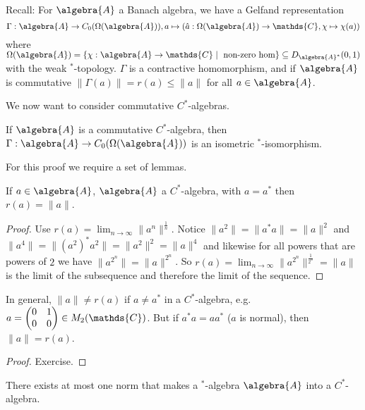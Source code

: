 \documentclass[a4paper]{article}
\begin{document}
Recall: For $\algebra{A}$ a Banach algebra, we have a Gelfand representation
\begin{equation*}
	\Gamma: \algebra{A} \to C_0(\Omega(\algebra{A})), a \mapsto (\hat{a}: \Omega(\algebra{A}) \to \mathds{C}, \chi \mapsto \chi(a))
\end{equation*}
where $\Omega(\algebra{A}) = \{\chi: \algebra{A} \to \mathds{C} \mid \text{ non-zero hom} \} \subseteq D_{\algebra{A}^*}(0,1)$ with the weak $^*$-topology.
$\Gamma$ is a contractive homomorphism, and if $\algebra{A}$ is commutative $\|\Gamma(a)\| = r(a) \leq \|a\|$ for all $a \in \algebra{A}$.

We now want to consider commutative $C^*$-algebras.

\begin{theorem}[Gelfand]
	If $\algebra{A}$ is a commutative $C^*$-algebra, then $\Gamma: \algebra{A} \to C_0(\Omega(\algebra{A}))$ is an isometric $^*$-isomorphism.
\end{theorem}

For this proof we require a set of lemmas.

\begin{lemma}
	If $a \in \algebra{A}$, $\algebra{A}$ a $C^*$-algebra, with $a = a^*$ then $r(a) = \|a\|$.
\end{lemma}

\begin{proof}
	Use $r(a) = \lim_{n \to \infty} \|a^n\|^{\frac{1}{n}}$.
	Notice $\|a^2\| = \|a^* a \| = \|a\|^2$ and $\|a^4\| = \|(a^2)^* a^2\| = \|a^2\|^2 = \|a\|^4$ and likewise for all powers that are powers of $2$ we have $\|a^{2^n}\| = \|a\|^{2^n}$.
	So $r(a) = \lim_{n \to \infty} \|a^{2^n}\|^{\frac{1}{2^n}} = \|a\|$ is the limit of the subsequence and therefore the limit of the sequence.
\end{proof}

\begin{remark}
	In general, $\|a\| \neq r(a)$ if $a \neq a^*$ in a $C^*$-algebra, e.g.
	$a = \qmatrix{0 & 1 \\ 0 & 0} \in M_2(\mathds{C})$.
	But if $a^* a = a a^*$ ($a$ is normal), then $\|a\| = r(a)$.
\end{remark}

\begin{proof}
	Exercise.
\end{proof}

\begin{corollary}
	There exists at most one norm that makes a $^*$-algebra $\algebra{A}$ into a $C^*$-algebra.
\end{corollary}
\end{document}

